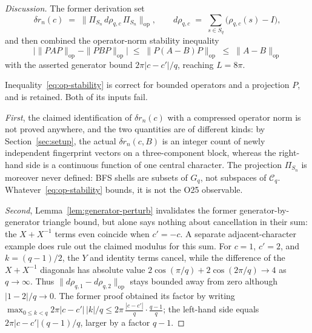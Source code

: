 \documentclass[12pt,a4paper]{article}
\theoremstyle{definition}
\theoremstyle{remark}
\newcommand{\Cq}{\mathcal{C}_q}
\newcommand{\rhoc}{\rho_{q,c}}
\begin{document}
    \begin{proof}[Discussion]
      The former derivation set
      \begin{equation*}
        \delta r_n(c) \;=\; \|\Pi_{S_n}\,d\rhoc\,\Pi_{S_n}\|_{\mathrm{op}},
        \qquad d\rhoc \;=\; \sum_{s \in S_q}\bigl(\rhoc(s) - I\bigr),
      \end{equation*}
      and then combined the operator-norm stability inequality
      \begin{equation}\label{eq:op-stability}
        \bigl|\|PAP\|_{\mathrm{op}} - \|PBP\|_{\mathrm{op}}\bigr|
        \;\leq\; \|P(A - B)P\|_{\mathrm{op}} \;\leq\; \|A - B\|_{\mathrm{op}}
      \end{equation}
      with the asserted generator bound $2\pi|c-c'|/q$, reaching $L = 8\pi$.

      Inequality~\eqref{eq:op-stability} is correct for bounded operators and a projection
      $P$, and is retained.
      Both of its inputs fail.

      \emph{First}, the claimed identification of $\delta r_n(c)$ with a compressed operator norm is
      not proved anywhere, and the two quantities are of different kinds: by
      Section~\ref{sec:setup}, the actual $\delta r_n(c,B)$ is an integer count of newly independent
      fingerprint vectors on a three-component block, whereas the right-hand side is a
      continuous function of one central character.
      The projection $\Pi_{S_n}$ is moreover never defined: BFS shells are subsets of $G_q$,
      not subspaces of $\Cq$.
      Whatever~\eqref{eq:op-stability} bounds, it is not the O25 observable.

      \emph{Second}, Lemma~\ref{lem:generator-perturb} invalidates the former
      generator-by-generator triangle bound, but alone says nothing about cancellation in
      their sum: the $X+X^{-1}$ terms even coincide when $c'=-c$.
      A separate adjacent-character example does rule out the claimed modulus for this sum.
      For $c=1$, $c'=2$, and $k=(q-1)/2$, the $Y$ and identity terms cancel, while the
      difference of the $X+X^{-1}$ diagonals has absolute value
      $2\cos(\pi/q)+2\cos(2\pi/q)\to4$ as $q\to\infty$.
      Thus $\|d\rho_{q,1}-d\rho_{q,2}\|_{\mathrm{op}}$ stays bounded away from zero
      although $|1-2|/q\to0$.
      The former proof obtained its factor by writing
      $\max_{0 \leq k < q} 2\pi|c-c'|\,|k|/q \leq 2\pi\,\frac{|c-c'|}{q}\cdot\frac{q-1}{q}$;
      the left-hand side equals $2\pi|c-c'|(q-1)/q$, larger by a factor $q-1$.
    \end{proof}
\end{document}
